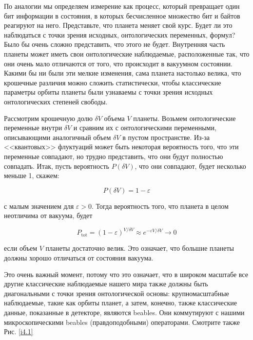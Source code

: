 \documentclass[main.tex]{subfiles}
\begin{document}
По аналогии мы определяем измерение как процесс, который превращает один бит информации в состояния, в которых бесчисленное множество бит и байтов реагируют на него. Представьте, что планета меняет свой курс. Будет ли это наблюдаться с точки зрения исходных, онтологических переменных, формул? Было бы очень сложно представить, что этого не будет. Внутренняя часть планеты может иметь свои онтологические наблюдаемые, расположенные так, что они очень мало отличаются от того, что происходит в вакуумном состоянии. Какими бы ни были эти мелкие изменения, сама планета настолько велика, что крошечные различия можно сложить статистически, чтобы классические параметры орбиты планеты были узнаваемы с точки зрения исходных онтологических степеней свободы.

Рассмотрим крошечную долю $\delta V$ объема $V$ планеты. Возьмем онтологические переменные внутри $\delta V$ и сравним их с онтологическими переменными, описывающими аналогичный объем $\delta V$ в пустом пространстве. Из-за <<квантовых>> флуктуаций может быть некоторая вероятность того, что эти переменные совпадают, но трудно представить, что они будут полностью совпадать. Итак, пусть вероятность $P (\delta V)$, что они совпадают, будет несколько меньше 1, скажем:

\begin{equation}\label{4.1}
	P (\delta V) = 1 - \varepsilon
\end{equation}
          
с малым значением для $\varepsilon > 0$. Тогда вероятность того, что планета в целом неотличима от вакуума, будет

\begin{equation}\label{4.2}
	P_{\mathrm{tot}}=(1-\varepsilon)^{V / \delta V} \approx e^{-\varepsilon V / \delta V} \rightarrow 0
\end{equation}
            
если объем $V$ планеты достаточно велик. Это означает, что большие планеты должны хорошо отличаться от состояния вакуума.

Это очень важный момент, потому что это означает, что в широком масштабе все другие классические наблюдаемые нашего мира также должны быть диагональными с точки зрения онтологической основы: крупномасштабные наблюдаемые, такие как орбиты планет, а затем, конечно, также классические данные, показанные в детекторе, являются beables. Они коммутируют с нашими микроскопическими beables (правдоподобными) операторами. Смотрите также Рис. \ref{i4.1}
\end{document}
